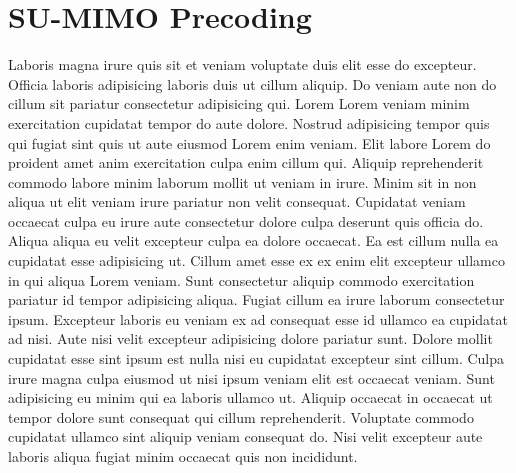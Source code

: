 \chapter{SU-MIMO Precoding}

Laboris magna irure quis sit et veniam voluptate duis elit esse do excepteur. Officia laboris adipisicing laboris duis ut cillum aliquip. Do veniam aute non do cillum sit pariatur consectetur adipisicing qui. Lorem Lorem veniam minim exercitation cupidatat tempor do aute dolore. Nostrud adipisicing tempor quis qui fugiat sint quis ut aute eiusmod Lorem enim veniam. Elit labore Lorem do proident amet anim exercitation culpa enim cillum qui. Aliquip reprehenderit commodo labore minim laborum mollit ut veniam in irure. Minim sit in non aliqua ut elit veniam irure pariatur non velit consequat. Cupidatat veniam occaecat culpa eu irure aute consectetur dolore culpa deserunt quis officia do. Aliqua aliqua eu velit excepteur culpa ea dolore occaecat. Ea est cillum nulla ea cupidatat esse adipisicing ut. Cillum amet esse ex ex enim elit excepteur ullamco in qui aliqua Lorem veniam. Sunt consectetur aliquip commodo exercitation pariatur id tempor adipisicing aliqua. Fugiat cillum ea irure laborum consectetur ipsum. Excepteur laboris eu veniam ex ad consequat esse id ullamco ea cupidatat ad nisi. Aute nisi velit excepteur adipisicing dolore pariatur sunt. Dolore mollit cupidatat esse sint ipsum est nulla nisi eu cupidatat excepteur sint cillum. Culpa irure magna culpa eiusmod ut nisi ipsum veniam elit est occaecat veniam. Sunt adipisicing eu minim qui ea laboris ullamco ut. Aliquip occaecat in occaecat ut tempor dolore sunt consequat qui cillum reprehenderit. Voluptate commodo cupidatat ullamco sint aliquip veniam consequat do. Nisi velit excepteur aute laboris aliqua fugiat minim occaecat quis non incididunt.
